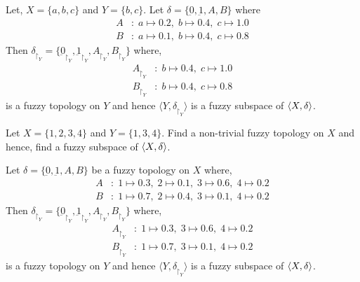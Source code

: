 \documentclass[../main-sheet.tex]{subfiles}
\begin{document}
\begin{ex}
    Let, \(X=\{a,b,c \}\) and \(Y=\{b,c \}\). Let \(\delta=\{\underbar{0},\underbar{1},A,B\}\) where
    \begin{align*}
        A&:\;a\mapsto0.2,\;b\mapsto0.4,\;c\mapsto1.0\\
        B&:\;a\mapsto0.1,\;b\mapsto0.4,\;c\mapsto 0.8
    \end{align*}
    Then \(\delta_{\upharpoonright_Y }=\{\underbar{0}_{\upharpoonright_Y },\underbar{1}_{\upharpoonright_Y },A_{\upharpoonright_Y },B_{\upharpoonright_Y }\}\) where,
    \begin{align*}
        A_{\upharpoonright_Y }&:\;b\mapsto0.4,\;c\mapsto1.0\\
        B_{\upharpoonright_Y }&:\;b\mapsto0.4,\;c\mapsto 0.8
    \end{align*}
    is a fuzzy topology on \(Y \) and hence \(\langle Y,\delta_{\upharpoonright_Y }\rangle\) is a fuzzy subspace of \(\langle X, \delta \rangle\).
\end{ex}
\begin{ex}
    Let \(X=\{1,2,3,4\}\) and \(Y=\{1,3,4\}\). Find a non-trivial fuzzy topology on \(X \) and hence, find a fuzzy subspace of \(\langle X, \delta \rangle\).
\end{ex}
\begin{soln}
    Let \(\delta=\{\underbar{0},\underbar{1},A,B\}\) be a fuzzy topology on \(X \) where,
    \begin{align*}
        A&:\;1\mapsto0.3,\;2\mapsto 0.1,\;3\mapsto0.6,\;4\mapsto 0.2\\
        B&:\;1\mapsto0.7,\;2\mapsto 0.4,\;3\mapsto0.1,\;4\mapsto 0.2
    \end{align*}
    Then \(\delta_{\upharpoonright_Y }=\{\underbar{0}_{\upharpoonright_Y },\underbar{1}_{\upharpoonright_Y },A_{\upharpoonright_Y },B_{\upharpoonright_Y }\}\) where,
    \begin{align*}
        A_{\upharpoonright_Y }&:\;1\mapsto0.3,\; 3\mapsto0.6,\;4\mapsto 0.2\\
        B_{\upharpoonright_Y }&:\;1\mapsto0.7,\;3\mapsto0.1,\;4\mapsto 0.2
    \end{align*}
    is a fuzzy topology on \(Y \) and hence \(\langle Y,\delta_{\upharpoonright_Y }\rangle\) is a fuzzy subspace of \(\langle X, \delta \rangle\).
\end{soln}
\end{document}
